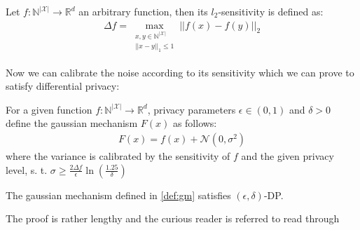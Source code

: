 \begin{definition}[$l_2$-sensitivity]
    Let $f:\mathbb{N}^{|\mathcal{X}|} \longrightarrow \mathbb{R}^d$ an arbitrary function, then its $l_2$-sensitivity is defined as:
    \begin{align}
        \Delta f = \max_{\substack{x,y \in \mathbb{N}^{|\mathcal{X}|} \\ ||x-y||_1\le 1}} ||f(x)-f(y)||_2 
    \end{align}
\end{definition}

Now we can calibrate the noise according to its sensitivity which we can prove to satisfy differential privacy:
\begin{definition}\label{def:gm} \label{def:gm}
    For a given function  $f:\mathbb{N}^{|\mathcal{X}|} \longrightarrow \mathbb{R}^d$, privacy parameters $\epsilon \in (0,1)$ and $\delta>0$ define the gaussian mechanism $F(x)$ as follows:
    \begin{align}
        F(x) = f(x) + \mathcal{N}(0, \sigma^2)
    \end{align}
    where the variance is calibrated by the sensitivity of $f$ and the given privacy level, s. t. $\sigma \ge \frac{2 \Delta f}{\epsilon}\ln(\frac{1.25}{\delta})$
\end{definition}

\begin{thm}
    The gaussian mechanism defined in \cref{def:gm} satisfies $(\epsilon, \delta)$-DP.
\end{thm}
The proof is rather lengthy and the curious reader is referred to read through \parencite[][Appendix A]{dwork2014algorithmic}